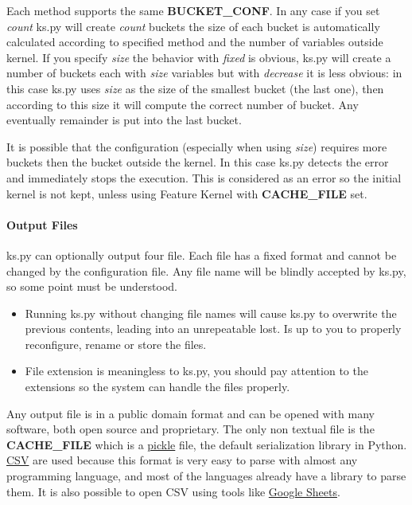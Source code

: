         Each method supports the same \textbf{BUCKET\_CONF}. In any case if you set \emph{count} ks.py will create \emph{count} buckets the size 
        of each bucket is automatically calculated according to specified method and the number of variables outside kernel.
        If you specify \emph{size} the behavior with \emph{fixed} is obvious, ks.py will create a number of buckets each with \emph{size} variables but
        with \emph{decrease} it is less obvious: in this case ks.py uses \emph{size} as the size of the smallest bucket (the last one), then according to
        this size it will compute the correct number of bucket. Any eventually remainder is put into the last bucket. 

        It is possible that the configuration (especially when using \emph{size}) requires more buckets then the bucket outside the kernel. In this case 
        ks.py detects the error and immediately stops the execution. This is considered as an error so the initial kernel is not kept, unless using Feature Kernel
        with \textbf{CACHE\_FILE} set.



        \paragraph{Output Files} ks.py can optionally output four file. Each file has a fixed format and cannot be changed by the configuration file. Any file 
        name will be blindly accepted by ks.py, so some point must be understood.
        \begin{itemize}
            \item Running ks.py without changing file names will cause ks.py to overwrite the previous contents, leading into an unrepeatable lost. Is up to 
            you to properly reconfigure, rename or store the files.
            \item File extension is meaningless to ks.py, you should pay attention to the extensions so the system can handle the files properly.
        \end{itemize} 


        Any output file is in a public domain format and can be opened with many software, both open source and proprietary. The only non textual file 
        is the \textbf{CACHE\_FILE} which is a \href{https://docs.python.org/3/library/pickle.html}{pickle} file, the default serialization library in Python.
        \href{https://en.wikipedia.org/wiki/Comma-separated_values}{CSV} are used because this format is very easy to parse with almost any  programming language, 
        and most of the languages already have a library to parse them. It is also possible to open CSV using tools like \href{https://docs.google.com/spreadsheets}{Google Sheets}. 
      
